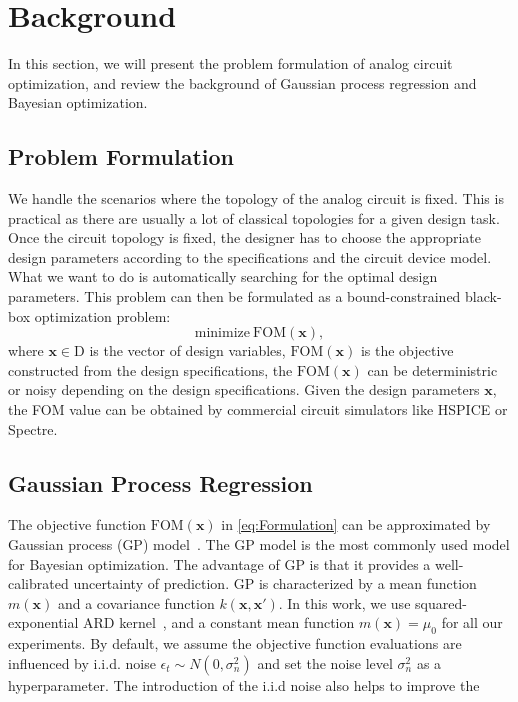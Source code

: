 \section{Background}

In this section, we will present the problem formulation of analog circuit optimization, and review the background of Gaussian process regression and Bayesian optimization.

\subsection{Problem Formulation}


We handle the scenarios where the topology of the analog circuit is fixed. This
is practical as there are usually a lot of classical topologies for a given
design task. Once the circuit topology is fixed, the designer has to choose the
appropriate design parameters according to the specifications and the circuit
device model. What we want to do is automatically searching for the optimal
design parameters. This problem can then be formulated as a bound-constrained
black-box optimization problem:
\begin{equation}
    \label{eq:Formulation}
    \text{minimize}~\mathrm{FOM}(\bm{x}),
\end{equation}
where $\bm{x} \in \textrm{D}$ is the vector of design variables,
$\mathrm{FOM}(\bm{x})$ is the objective constructed from the design
specifications, the $\mathrm{FOM}(\bm{x})$ can be deterministric or noisy
depending on the design specifications. Given the design parameters $\bm{x}$,
the FOM value can be obtained by commercial circuit simulators like HSPICE or
Spectre.

\subsection{Gaussian Process Regression}


The objective function $\mathrm{FOM}(\bm{x})$ in \eqref{eq:Formulation} can be
approximated by Gaussian process (GP) model~\cite{GPML}. The GP model is the
most commonly used model for Bayesian optimization. The advantage of GP is that
it provides a well-calibrated uncertainty of prediction. GP is characterized by
a mean function $m(\bm{x})$ and a covariance function $k(\bm{x}, \bm{x'})$. In
this work, we use squared-exponential ARD kernel~\cite{GPML}, and a constant
mean function $m(\bm{x}) = \mu_0$ for all our experiments. By default, we
assume the objective function evaluations are influenced by i.i.d. noise
$\epsilon_t \sim N(0, \sigma_n^2)$ and set the noise level $\sigma_n^2$ as a
hyperparameter.  The introduction of the i.i.d noise also helps to improve the

